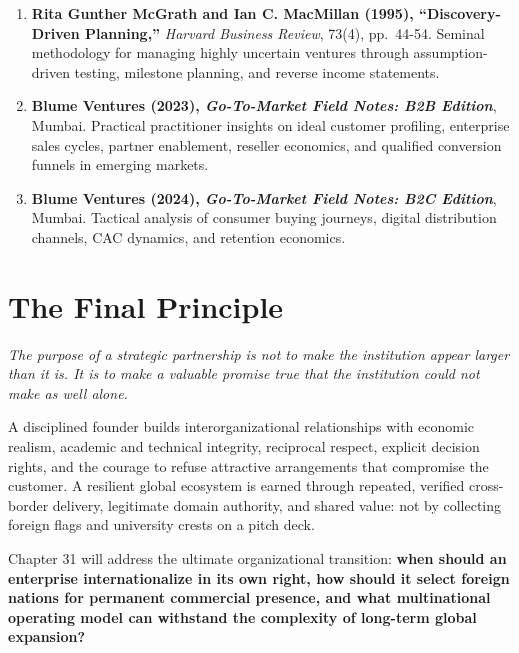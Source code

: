 \begin{enumerate}
\item \textbf{Rita Gunther McGrath and Ian C. MacMillan (1995), ``Discovery-Driven Planning,''} \textit{Harvard Business Review}, 73(4), pp.~44-54. Seminal methodology for managing highly uncertain ventures through assumption-driven testing, milestone planning, and reverse income statements.
\item \textbf{Blume Ventures (2023), \textit{Go-To-Market Field Notes: B2B Edition}}, Mumbai. Practical practitioner insights on ideal customer profiling, enterprise sales cycles, partner enablement, reseller economics, and qualified conversion funnels in emerging markets.
\item \textbf{Blume Ventures (2024), \textit{Go-To-Market Field Notes: B2C Edition}}, Mumbai. Tactical analysis of consumer buying journeys, digital distribution channels, CAC dynamics, and retention economics.
\end{enumerate}

\section*{The Final Principle}
\label{sec:ch30_the_final_principle}

\begin{tcolorbox}[colback=BayesCanvas,colframe=BayesTeal,arc=1mm,title=\textbf{The Final Principle of Strategic Ecosystems}]
\itshape
The purpose of a strategic partnership is not to make the institution appear larger than it is. It is to make a valuable promise true that the institution could not make as well alone.
\end{tcolorbox}

A disciplined founder builds interorganizational relationships with economic realism, academic and technical integrity, reciprocal respect, explicit decision rights, and the courage to refuse attractive arrangements that compromise the customer. A resilient global ecosystem is earned through repeated, verified cross-border delivery, legitimate domain authority, and shared value: not by collecting foreign flags and university crests on a pitch deck.

Chapter 31 will address the ultimate organizational transition: \textbf{when should an enterprise internationalize in its own right, how should it select foreign nations for permanent commercial presence, and what multinational operating model can withstand the complexity of long-term global expansion?}
